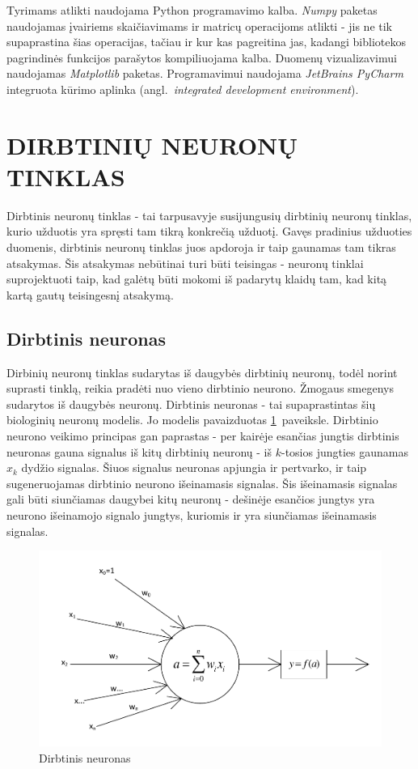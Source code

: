 \documentclass{VUMIFPSbakalaurinis}
\begin{document}
Tyrimams atlikti naudojama Python programavimo kalba.
\textit{Numpy} paketas naudojamas įvairiems skaičiavimams ir matricų operacijoms atlikti - jis ne tik supaprastina šias operacijas, tačiau ir kur kas pagreitina jas, kadangi bibliotekos pagrindinės funkcijos parašytos kompiliuojama kalba.
Duomenų vizualizavimui naudojamas \textit{Matplotlib} paketas.
Programavimui naudojama \textit{JetBrains PyCharm} integruota kūrimo aplinka (angl.~\textit{integrated development environment}).



\section{DIRBTINIŲ NEURONŲ TINKLAS}

Dirbtinis neuronų tinklas - tai tarpusavyje susijungusių dirbtinių neuronų tinklas, kurio užduotis yra spręsti tam tikrą konkrečią užduotį.
Gavęs pradinius užduoties duomenis, dirbtinis neuronų tinklas juos apdoroja ir taip gaunamas tam tikras atsakymas.
Šis atsakymas nebūtinai turi būti teisingas - neuronų tinklai suprojektuoti taip, kad galėtų būti mokomi iš padarytų klaidų tam, kad kitą kartą gautų teisingesnį atsakymą.

\subsection{Dirbtinis neuronas}

Dirbinių neuronų tinklas sudarytas iš daugybės dirbtinių neuronų, todėl norint suprasti tinklą, reikia pradėti nuo vieno dirbtinio neurono.
Žmogaus smegenys sudarytos iš daugybės neuronų.
Dirbtinis neuronas - tai supaprastintas šių biologinių neuronų modelis.
Jo modelis pavaizduotas \ref{fig:neuron}~paveiksle.
Dirbtinio neurono veikimo principas gan paprastas - per kairėje esančias jungtis dirbtinis neuronas gauna signalus iš kitų dirbtinių neuronų - iš $k$-tosios jungties gaunamas $x_k$ dydžio signalas.
Šiuos signalus neuronas apjungia ir pertvarko, ir taip sugeneruojamas dirbtinio neurono išeinamasis signalas.
Šis išeinamasis signalas gali būti siunčiamas daugybei kitų neuronų - dešinėje esančios jungtys yra neurono išeinamojo signalo jungtys, kuriomis ir yra siunčiamas išeinamasis signalas.

\begin{figure}[h]
	\centering
	\includegraphics[scale=0.65]{diagrams/1_neuron}
	\caption{Dirbtinis neuronas}
	\label{fig:neuron}
\end{figure}
\end{document}

